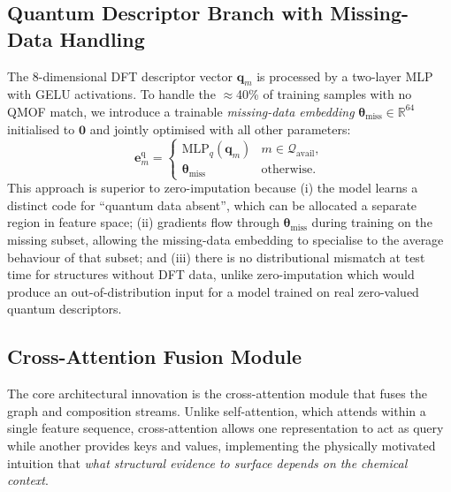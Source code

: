 \documentclass[conference]{IEEEtran}
\begin{document}
\subsection{Quantum Descriptor Branch with Missing-Data Handling}
\label{sec:arch_q}

The 8-dimensional DFT descriptor vector $\mathbf{q}_m$ is processed by a
two-layer MLP with GELU activations.  To handle the $\approx$40\% of
training samples with no QMOF match, we introduce a trainable
\emph{missing-data embedding} $\boldsymbol{\theta}_{\text{miss}}\in\mathbb{R}^{64}$
initialised to $\mathbf{0}$ and jointly optimised with all other parameters:
\begin{equation}
  \mathbf{e}^{\text{q}}_m =
  \begin{cases}
    \mathrm{MLP}_q(\mathbf{q}_m)     & m\in\mathcal{Q}_{\text{avail}}, \\
    \boldsymbol{\theta}_{\text{miss}} & \text{otherwise.}
  \end{cases}
  \label{eq:qbranch}
\end{equation}
This approach is superior to zero-imputation because (i) the model learns a
distinct code for ``quantum data absent'', which can be allocated a separate
region in feature space; (ii) gradients flow through
$\boldsymbol{\theta}_{\text{miss}}$ during training on the missing subset,
allowing the missing-data embedding to specialise to the average behaviour
of that subset; and (iii) there is no distributional mismatch at test time
for structures without DFT data, unlike zero-imputation which would produce
an out-of-distribution input for a model trained on real zero-valued quantum
descriptors.

\subsection{Cross-Attention Fusion Module}
\label{sec:arch_fusion}

The core architectural innovation is the cross-attention module that fuses
the graph and composition streams.  Unlike self-attention, which attends
within a single feature sequence, cross-attention allows one representation
to act as query while another provides keys and values, implementing the
physically motivated intuition that \emph{what structural evidence to surface
depends on the chemical context}.
\end{document}
